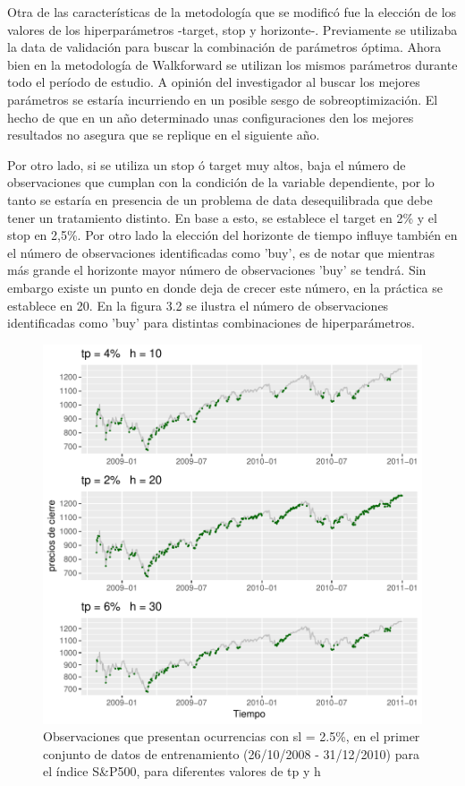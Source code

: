 \documentclass[a4paper,12pt]{Latex/Classes/PhDthesisPSnPDF}
\begin{document}
Otra de las características de la metodología que se modificó fue la elección de los valores de los hiperparámetros -target, stop y horizonte-. Previamente se utilizaba la data de validación para buscar la combinación de parámetros óptima. Ahora bien en la metodología de Walkforward se utilizan los mismos parámetros durante todo el período de estudio. A opinión del investigador al buscar los mejores parámetros se estaría incurriendo en un posible sesgo de sobreoptimización. El hecho de que en un año determinado unas configuraciones den los mejores resultados no asegura que se replique en el siguiente año.

Por otro lado, si se utiliza un stop ó target muy altos, baja el número de observaciones que cumplan con la condición de la variable dependiente, por lo tanto se estaría en presencia de un problema de data desequilibrada que debe tener un tratamiento distinto. En base a esto, se establece el target en 2\% y el stop en 2,5\%. Por otro lado la elección del horizonte de tiempo influye también en el número de observaciones identificadas como 'buy', es de notar que mientras más grande el horizonte mayor número de observaciones 'buy' se tendrá. Sin embargo existe un punto en donde deja de crecer este número, en la práctica se establece en 20. En la figura 3.2 se ilustra el número de observaciones identificadas como 'buy' para distintas combinaciones de hiperparámetros.


\begin{figure}[H]
\centering
\includegraphics{main-003}
\caption{Observaciones que presentan ocurrencias con sl = 2.5\%, en el primer conjunto de datos de entrenamiento (26/10/2008 - 31/12/2010) para el índice S\&P500, para diferentes valores de tp y h}
\end{figure}
\end{document}
